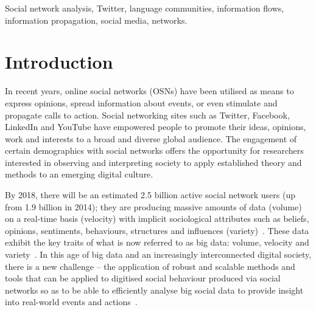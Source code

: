\documentclass[conference]{IEEEtran}
\begin{document}
%

\begin{IEEEkeywords}
Social network analysis, Twitter, language communities, information
flows, information propagation, social media, networks.
\end{IEEEkeywords}


\section{Introduction}\label{intro}

In recent years, online social networks (OSNs) have been utilised as
means to express opinions, spread information about events, or even
stimulate and propagate calls to action. Social networking sites such
as Twitter, Facebook, LinkedIn and YouTube have empowered people to
promote their ideas, opinions, work and interests to a broad and
diverse global audience. The engagement of certain demographics with
social networks offers the opportunity for researchers interested in
observing and interpreting society to apply established theory and
methods to an emerging digital culture.

By 2018, there will be an estimated 2.5 billion active social network
users (up from 1.9 billion in 2014); they are producing massive
amounts of data (volume) on a real-time basis (velocity) with implicit
sociological attributes such as beliefs, opinions, sentiments,
behaviours, structures and influences
(variety)~\cite{burnap-et-al:2015}. These data exhibit the key traits
of what is now referred to as big data: volume, velocity and
variety~\cite{postsm:2014}. In this age of big data and an
increasingly interconnected digital society, there is a new challenge
-- the application of robust and scalable methods and tools that can
be applied to digitised social behaviour produced via social networks
so as to be able to efficiently analyse big social data to provide
insight into real-world events and
actions~\cite{lazer-et-al:2009,burnap-et-al:2015}.

\end{document}
